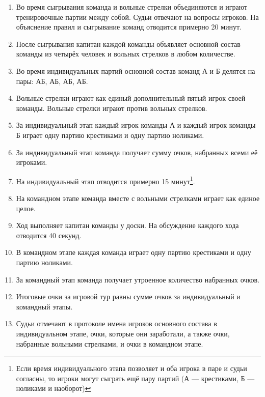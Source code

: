 \documentclass[11pt]{article} %
\begin{document}
\begin{enumerate}
    \item Во время сыгрывания команда и вольные стрелки объединяются и играют тренировочные партии между собой. 
    Судьи отвечают на вопросы игроков. На объяснение правил и сыгрывание команд отводится примерно 20 минут. 
    \item После сыгрывания капитан каждой команды объявляет основной состав команды из четырёх человек и вольных стрелков в любом количестве.
    \item Во время индивидуальных партий основной состав команд А и Б делятся на пары: АБ, АБ, АБ, АБ. 
    \item Вольные стрелки играют как единый дополнительный пятый игрок своей команды. 
    Вольные стрелки играют против вольных стрелков. 
    \item За индивидуальный этап каждый игрок команды А и каждый игрок команды Б играет одну партию крестиками и одну партию ноликами. 
    \item За индивидуальный этап команда получает сумму очков, набранных всеми её игроками. 
    \item На индивидуальный этап отводится примерно 15 минут\footnote{Если время индивидуального этапа позволяет и оба игрока в паре и судьи согласны, то игроки могут сыграть ещё пару партий (А — крестиками, Б — ноликами и наоборот)}.
    \item На командном этапе команда вместе с вольными стрелками играет как единое целое. 
    \item Ход выполняет капитан команды у доски. На обсуждение каждого хода отводится 40 секунд. 
    \item В командном этапе каждая команда играет одну партию крестиками и одну партию ноликами.
    \item За командный этап команда получает утроенное количество набранных очков. 
    \item Итоговые очки за игровой тур равны сумме очков за индивидуальный и командный этапы.
    \item Судьи отмечают в протоколе имена игроков основного состава в индивидуальном этапе, очки, которые они заработали, 
    а также очки, набранные вольными стрелками, и очки в командном этапе. 
\end{enumerate}
\end{document}
